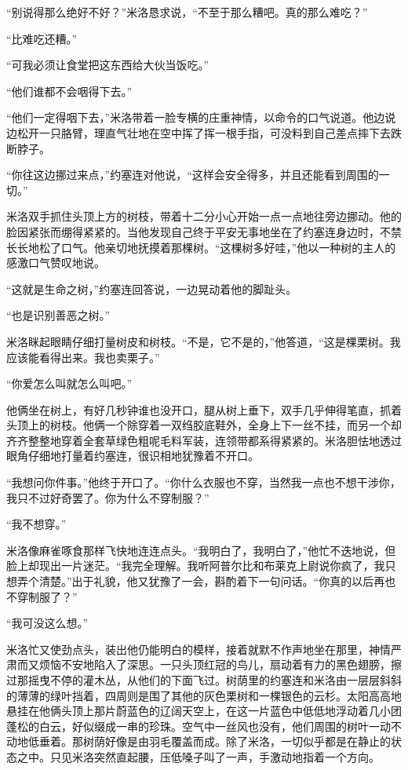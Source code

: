     “别说得那么绝好不好？”米洛恳求说，“不至于那么糟吧。真的那么难吃？”

    “比难吃还糟。”

    “可我必须让食堂把这东西给大伙当饭吃。”

    “他们谁都不会咽得下去。”

    “他们一定得咽下去，”米洛带着一脸专横的庄重神情，以命令的口气说道。他边说边松开一只胳臂，理直气壮地在空中挥了挥一根手指，可没料到自己差点摔下去跌断脖子。

    “你往这边挪过来点，”约塞连对他说，“这样会安全得多，并且还能看到周围的一切。”

    米洛双手抓住头顶上方的树枝，带着十二分小心开始一点一点地往旁边挪动。他的脸因紧张而绷得紧紧的。当他发现自己终于平安无事地坐在了约塞连身边时，不禁长长地松了口气。他亲切地抚摸着那棵树。“这棵树多好哇，”他以一种树的主人的感激口气赞叹地说。

    “这就是生命之树，”约塞连回答说，一边晃动着他的脚趾头。

    “也是识别善恶之树。”

    米洛眯起眼睛仔细打量树皮和树枝。“不是，它不是的，”他答道，“这是棵栗树。我应该能看得出来。我也卖栗子。”

    “你爱怎么叫就怎么叫吧。”

    他俩坐在树上，有好几秒钟谁也没开口，腿从树上垂下，双手几乎伸得笔直，抓着头顶上的树枝。他俩一个除穿着一双绉胶底鞋外，全身上下一丝不挂，而另一个却齐齐整整地穿着全套草绿色粗呢毛料军装，连领带都系得紧紧的。米洛胆怯地透过眼角仔细地打量着约塞连，很识相地犹豫着不开口。

    “我想问你件事。”他终于开口了。“你什么衣服也不穿，当然我一点也不想干涉你，我只不过好奇罢了。你为什么不穿制服？”

    “我不想穿。”

    米洛像麻雀啄食那样飞快地连连点头。“我明白了，我明白了，”他忙不迭地说，但脸上却现出一片迷茫。“我完全理解。我听阿普尔比和布莱克上尉说你疯了，我只想弄个清楚。”出于礼貌，他又犹豫了一会，斟酌着下一句问话。“你真的以后再也不穿制服了？”

    “我可没这么想。”

    米洛忙又使劲点头，装出他仍能明白的模样，接着就默不作声地坐在那里，神情严肃而又烦恼不安地陷入了深思。一只头顶红冠的鸟儿，扇动着有力的黑色翅膀，擦过那摇曳不停的灌木丛，从他们的下面飞过。树荫里的约塞连和米洛由一层层斜斜的薄薄的绿叶挡着，四周则是围了其他的灰色栗树和一棵银色的云杉。太阳高高地悬挂在他俩头顶上那片蔚蓝色的辽阔天空上，在这一片蓝色中低低地浮动着几小团蓬松的白云，好似缀成一串的珍珠。空气中一丝风也没有，他们周围的树叶一动不动地低垂着。那树荫好像是由羽毛覆盖而成。除了米洛，一切似乎都是在静止的状态之中。只见米洛突然直起腰，压低嗓子叫了一声，手激动地指着一个方向。

